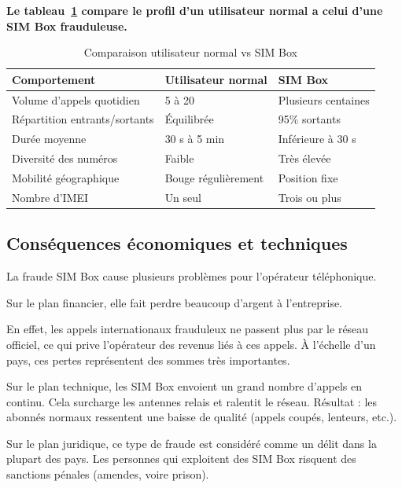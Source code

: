 \documentclass[12pt, oneside, a4paper]{report}
\begin{document}
\vspace{0.5 cm}
\textbf{Le tableau~\ref{tab:simbox-vs-humain} compare le profil d'un utilisateur normal a celui d'une SIM Box frauduleuse.}

\begin{table}[h!]
\centering
\caption{Comparaison utilisateur normal vs SIM Box}
\label{tab:simbox-vs-humain}
\vspace{0.3cm}
\renewcommand{\arraystretch}{1.3}
\begin{tabular}{|l|l|l|}
\hline
\textbf{Comportement} & \textbf{Utilisateur normal} & \textbf{SIM Box} \\
\hline
Volume d'appels quotidien & 5 à 20 & Plusieurs centaines \\
\hline
Répartition entrants/sortants & Équilibrée & 95\% sortants \\
\hline
Durée moyenne & 30 s à 5 min & Inférieure à 30 s \\
\hline
Diversité des numéros & Faible & Très élevée \\
\hline
Mobilité géographique & Bouge régulièrement & Position fixe \\
\hline
Nombre d'IMEI & Un seul & Trois ou plus \\
\hline
\end{tabular}
\end{table}


\subsection{Conséquences économiques et techniques}
La fraude SIM Box cause plusieurs problèmes pour l'opérateur téléphonique.

Sur le plan financier, elle fait perdre beaucoup d'argent à l'entreprise. 

\vspace{0.3cm}
En effet, les appels internationaux frauduleux ne passent plus par le réseau officiel, ce qui prive l'opérateur des revenus liés à ces appels. À l'échelle d'un pays, ces pertes représentent des sommes très importantes.

Sur le plan technique, les SIM Box envoient un grand nombre d'appels en continu. Cela surcharge les antennes relais et ralentit le réseau. Résultat : les abonnés normaux ressentent une baisse de qualité (appels coupés, lenteurs, etc.).

Sur le plan juridique, ce type de fraude est considéré comme un délit dans la plupart des pays. Les personnes qui exploitent des SIM Box risquent des sanctions pénales (amendes, voire prison).
\end{document}
